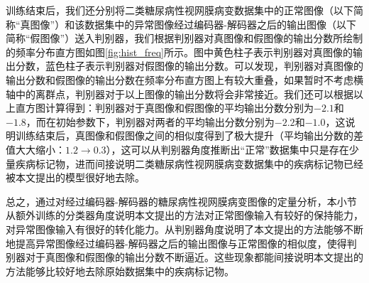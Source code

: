 训练结束后，我们还分别将二类糖尿病性视网膜病变数据集中的正常图像（以下简称“真图像”）和该数据集中的异常图像经过编码器-解码器之后的输出图像（以下简称“假图像”）送入判别器，我们根据判别器对真图像和假图像的输出分数所绘制的频率分布直方图如图\ref{fig:hist_freq}所示。图中黄色柱子表示判别器对真图像的输出分数，蓝色柱子表示判别器对假图像的输出分数。可以发现，判别器对真图像的输出分数和假图像的输出分数在频率分布直方图上有较大重叠，如果暂时不考虑横轴中的离群点，判别器对于以上图像的输出分数将会非常接近。我们还可以根据以上直方图计算得到：判别器对于真图像和假图像的平均输出分数分别为$-2.1$和$-1.8$，而在初始参数下，判别器对两者的平均输出分数分别为$-2.2$和$-1.0$，这说明训练结束后，真图像和假图像之间的相似度得到了极大提升（平均输出分数的差值大大缩小：$1.2\rightarrow 0.3$），这可以从判别器角度推断出“正常”数据集中只是存在少量疾病标记物，进而间接说明二类糖尿病性视网膜病变数据集中的疾病标记物已经被本文提出的模型很好地去除。

总之，通过对经过编码器-解码器的糖尿病性视网膜病变图像的定量分析，本小节从额外训练的分类器角度说明本文提出的方法对正常图像输入有较好的保持能力，对异常图像输入有很好的转化能力。从判别器角度说明了本文提出的方法能够不断地提高异常图像经过编码器-解码器之后的输出图像与正常图像的相似度，使得判别器对于真图像和假图像的输出分数不断逼近。这些现象都能间接说明本文提出的方法能够比较好地去除原始数据集中的疾病标记物。
